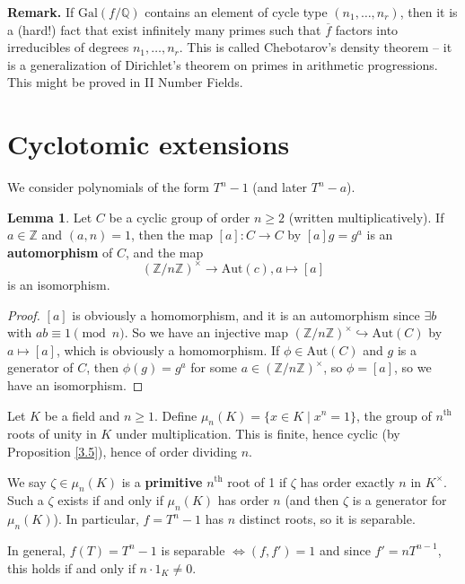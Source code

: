 \documentclass{article}
\theoremstyle{definition}
\newtheorem{lemma}[theorem]{Lemma}
\begin{document}
\textbf{Remark.} If $\text{Gal}(f/\mathbb{Q})$ contains an element of cycle type $(n_1,\ldots,n_r)$, then it is a (hard!) fact that exist infinitely many primes such that $\overline{f}$ factors into irreducibles of degrees $n_1,\ldots,n_r$. This is called Chebotarov's density theorem -- it is a generalization of Dirichlet's theorem on primes in arithmetic progressions. This might be proved in II Number Fields.

\section{Cyclotomic extensions}
We consider polynomials of the form $T^n-1$ (and later $T^n-a$).

\begin{lemma}\label{11.1}
    Let $C$ be a cyclic group of order $n \ge 2$ (written multiplicatively). If $a \in \mathbb{Z}$ and $(a,n)=1$, then the map $[a] : C \to C$ by $[a]g=g^a$ is an \textbf{automorphism} of $C$, and the map $$(\mathbb{Z}/n\mathbb{Z})^{\times} \to \text{Aut}(c), a \mapsto [a]$$ is an isomorphism.
\end{lemma}
\begin{proof}
    $[a]$ is obviously a homomorphism, and it is an automorphism since $\exists b$ with $ab \equiv 1 \pmod{n}$. So we have an injective map $(\mathbb{Z}/n\mathbb{Z})^{\times} \hookrightarrow \text{Aut}(C)$ by $a \mapsto [a]$, which is obviously a homomorphism. If $\phi \in \text{Aut}(C)$ and $g$ is a generator of $C$, then $\phi(g)=g^a$ for some $a \in (\mathbb{Z}/n\mathbb{Z})^{\times}$, so $\phi = [a]$, so we have an isomorphism.
\end{proof}


Let $K$ be a field and $n\ge 1$. Define $\mu_n(K)= \{x \in K \mid x^n=1\}$, the group of $n^{\text{th}}$ roots of unity in $K$ under multiplication. This is finite, hence cyclic (by Proposition \ref{3.5}), hence of order dividing $n$.
\vspace{1mm}

We say $\zeta \in \mu_n(K)$ is a \textbf{primitive} $n^{\text{th}}$ root of 1 if $\zeta$ has order exactly $n$ in $K^{\times}$. Such a $\zeta$ exists if and only if $\mu_n(K)$ has order $n$ (and then $\zeta$ is a generator for $\mu_n(K)$). In particular, $f=T^n-1$ has $n$ distinct roots, so it is separable.
\vspace{1mm}

In general, $f(T)=T^n-1$ is separable $\iff (f,f')=1$ and since $f'=nT^{n-1}$, this holds if and only if $n\cdot 1_K \neq 0$.
\vspace{1mm}
\end{document}
